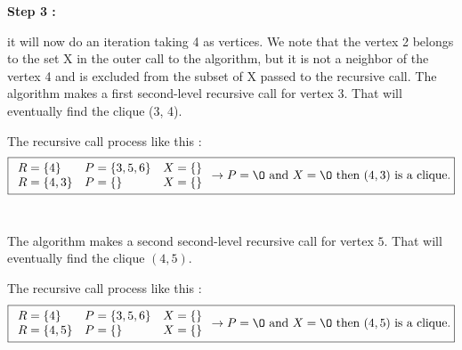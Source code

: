 \hspace*{1cm}  \textbf{Step 3 :}
\\
\begin{minipage}{0.4\textwidth}
\end{minipage}
\begin{minipage}{0.6\textwidth}
    it will now do an iteration taking 4 as vertices. We note that the vertex 2 belongs to the set X in the outer call to the algorithm, but it is not a neighbor of the vertex 4 and is excluded from the subset of X passed to the recursive call. The algorithm makes a first second-level recursive call for vertex 3. That will eventually find the clique (3, 4).
\end{minipage}
The recursive call process like this  :
$$ \boxed{
        \begin{array}{lll}
            R = \{4\}   & P = \{3,5,6\} & X = \{\} \\
            R = \{4,3\} & P = \{\}      & X = \{\} \\
        \end{array}
        \rightarrow P = \O \text{ and } X = \O \text{ then } (4,3) \text{ is a clique.}
    }$$
\\
\begin{minipage}{0.4\textwidth}
\end{minipage}
\begin{minipage}{0.6\textwidth}
    The algorithm makes a second second-level recursive call for vertex $5$. That will eventually find the clique $(4,5)$.
\end{minipage}
The recursive call process like this  :
$$ \boxed{
        \begin{array}{lll}
            R = \{4\}   & P = \{3,5,6\} & X = \{\} \\
            R = \{4,5\} & P = \{\}      & X = \{\} \\
        \end{array}
        \rightarrow P = \O \text{ and } X = \O \text{ then } (4,5) \text{ is a clique.}
    }$$

